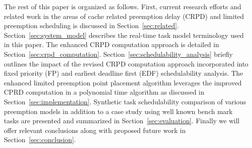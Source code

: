 The rest of this paper is organized as follows. First, current research efforts and related work in the areas of cache related preemption delay (CRPD) and limited preemption scheduling is discussed in Section~\ref{sec:related}.  Section~\ref{sec:system_model} describes the real-time task model terminology used in this paper.  The enhanced CRPD computation approach is detailed in Section~\ref{sec:crpd_computation}. Section~\ref{sec:schedulability_analysis} briefly outlines the impact of the revised CRPD computation approach incorporated into fixed priority (FP) and earliest deadline first (EDF) schedulability analysis.  The enhanced limited preemption point placement algorithm leverages the improved CPRD computation in a polynomial time algorithm as discussed in Section~\ref{sec:implementation}.  Synthetic task schedulability comparison of various preemption models in addition to a case study using well known bench mark tasks are presented and summarized in Section~\ref{sec:evaluation}.  Finally we will offer relevant conclusions along with proposed future work in Section~\ref{sec:conclusion}. 